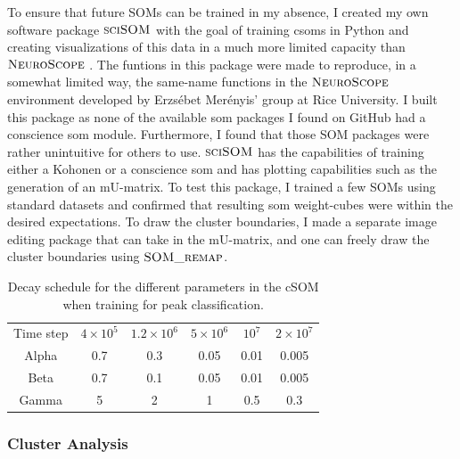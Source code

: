 To ensure that future SOMs can be trained in my absence, I created my own software package $\textsc{sciSOM}$ \cite{sciSOM2025}with the goal of training \acrshort{csom}s in Python and creating visualizations of this data in a much more limited capacity than $\textsc{NeuroScope}$ \cite{Alma_NS, Alma_website}. The funtions in this package were made to reproduce, in a somewhat limited way, the same-name functions in the $\textsc{NeuroScope}$ environment developed by Erzsébet Merényis' group at Rice University. I built this package as none of the available \acrshort{som} packages I found on GitHub had a conscience \acrshort{som} module. Furthermore, I found that those SOM packages were rather unintuitive for others to use. $\textsc{sciSOM}$ has the capabilities of training either a Kohonen or a conscience \acrshort{som} and has plotting capabilities such as the generation of an mU-matrix. To test this package, I trained a few SOMs using standard datasets and confirmed that resulting \acrshort{som} weight-cubes were within the desired expectations.
To draw the cluster boundaries, I made a separate image editing package that can take in the mU-matrix, and one can freely draw the cluster boundaries using $\textsc{SOM\_remap}$.


\begin{table}[]
    \centering
    \begin{tabular}{|c|c|c|c|c|c|}
     Time step & $4 \times10^5$ & $1.2 \times10^6$  & $5 \times10^6$  & $10^7$  & $2 \times10^7$  \\
     Alpha & 0.7 & 0.3 & 0.05 & 0.01 & 0.005 \\
     Beta & 0.7 & 0.1 & 0.05 & 0.01 & 0.005 \\
     Gamma & 5 & 2 & 1 & 0.5 & 0.3 \\ 
    \end{tabular}
    \caption{Decay schedule for the different parameters in the cSOM when training for peak classification.}
    \label{tab:som_peaklet_decay_schedule}
\end{table}

\subsubsection{Cluster Analysis}

